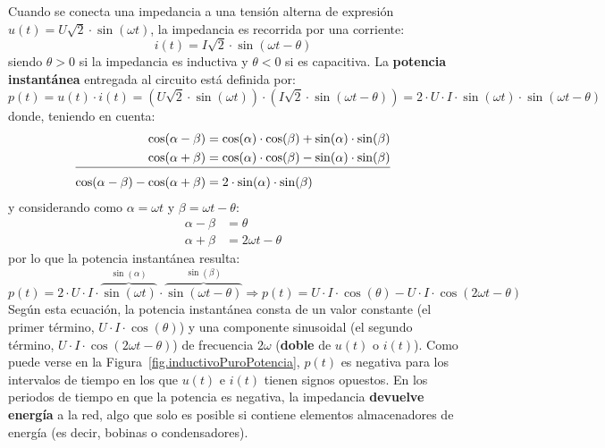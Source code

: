 \documentclass[11pt]{book} %
\begin{document}
	Cuando se conecta una impedancia a una tensión alterna de expresión $u(t) = U\sqrt{2} \cdot\sin (\omega t)$, la impedancia es recorrida por una corriente:
	\begin{equation*}
		i(t) = I\sqrt{2} \cdot \sin (\omega t -\theta)
	\end{equation*}
	siendo $\theta>0$ si la impedancia es inductiva y $\theta<0$ si es capacitiva. La \textbf{potencia instantánea} entregada al circuito está definida por:
	\begin{equation*}
		p(t)=u(t)\cdot i(t)=\left(U\sqrt{2}\cdot \sin (\omega t) \right)\cdot \left(I\sqrt{2} \cdot \sin (\omega t -\theta)\right)=2\cdot U\cdot I\cdot \sin(\omega t)\cdot\sin(\omega t-\theta)
	\end{equation*}
	donde, teniendo en cuenta:
	\begin{align*}
		\cos(\alpha-\beta)&=\cos(\alpha)\cdot\cos(\beta)+\sin(\alpha)\cdot\sin(\beta)\\
		\cos(\alpha+\beta)&=\cos(\alpha)\cdot\cos(\beta)-\sin(\alpha)\cdot\sin(\beta)\\[-10pt]
		\cline{1-2}
		\cos(\alpha-\beta)-\cos(\alpha+\beta)&=2\cdot\sin(\alpha)\cdot\sin(\beta)%
	\end{align*}
	y considerando como $\alpha=\omega t$ y $\beta=\omega t-\theta$:
	\begin{align*}
		\alpha-\beta&=\theta\\
		\alpha +\beta&=2\omega t-\theta
	\end{align*}
	por lo que la potencia instantánea resulta:
	\begin{equation}\label{eq.pot_inst}
		p(t)=2\cdot U\cdot I\cdot \overbrace{\sin(\omega t)}^{\sin(\alpha)}\cdot\overbrace{\sin(\omega t-\theta)}^{\sin(\beta)}\Rightarrow \boxed{p(t)
			=U\cdot I \cdot \cos(\theta)-U\cdot I \cdot\cos(2\omega t-\theta)}
	\end{equation}
	Según esta ecuación, la potencia instantánea consta de un {valor constante} (el primer término, $U\cdot I\cdot \cos(\theta)$) y una componente sinusoidal (el segundo término, $U\cdot I\cdot \cos(2 \omega t-\theta)$) de frecuencia $2\omega$ (\textbf{doble} de $u(t)$ o $i(t)$). Como puede verse en la Figura~\ref{fig.inductivoPuroPotencia}, $p(t)$ es negativa para los intervalos de tiempo en los que $u(t)$ e $i(t)$ tienen signos opuestos. En los periodos de tiempo en que la potencia es negativa, la impedancia \textbf{devuelve energía} a la red, algo que solo es posible si contiene elementos almacenadores de energía (es decir, bobinas o condensadores). 
	
\end{document}
